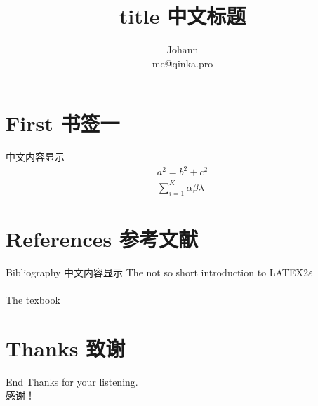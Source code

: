 \documentclass[10pt, mathserif]{beamer}
\begin{document}
    \title[abbreviation]{ title 中文标题}
    \author{ Johann \\ me@qinka.pro}


    \begin{frame}
        \titlepage	%
    \end{frame}

    \section{First 书签一}
    \begin{frame}
        中文内容显示
        \begin{align}
            a^2 = b^2 + c^2 \\
            \sum_{i=1}^{K} \alpha \beta \lambda
        \end{align}
    \end{frame}

    \section{References 参考文献}
    \begin{frame}[allowframebreaks]{Bibliography}
        中文内容显示
        The not so short introduction to LATEX2$\varepsilon$ \cite{Oetiker2015Latex} \\
        ~\\
        The texbook \cite{knuth1984texbook}
        \label{Reference}
    \end{frame}

    \section{Thanks 致谢}
    \begin{frame}{End}
        Thanks for your listening. \\
        感谢！
    \end{frame}
\end{document}
